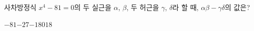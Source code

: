 사차방정식 $x^4-81=0$의 두 실근을 $\alpha$, $\beta$, 두 허근을 $\gamma$, $\delta$라 할 때, $\alpha\beta-\gamma\delta$의 값은?
\begin{choices32}{$-81$}{$-27$}{$-18$}{$0$}{$18$}\end{choices32}
